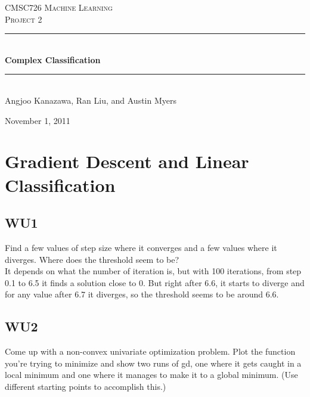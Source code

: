 \documentclass[a4paper,11pt]{article}
\newcommand{\HRule}{\rule{\linewidth}{0.5mm}}
\begin{document}
\begin{titlepage}
\begin{center}

\textsc{\LARGE CMSC726 Machine Learning}\\[1.5cm]

\textsc{\Large Project 2}\\[0.5cm]

\HRule \\[0.5cm]

{ \huge \bfseries Complex Classification}\\[0.4cm]

\HRule \\[1.5cm]

{\large Angjoo Kanazawa, Ran Liu, and Austin Myers}

\vfill

{\large November 1, 2011}

\end{center}
\end{titlepage}
{}

\section{Gradient Descent and Linear Classification}
\subsection{WU1}
\textsf{Find a few values of step size where it converges and a few
  values where it diverges. Where does the threshold seem to be?}\\

It depends on what the number of iteration is, but with 100
iterations, from step 0.1 to 6.5 it finds a solution close to
0. But right after 6.6, it starts to diverge and for any value after
6.7 it diverges, so the threshold seems to be around 6.6.

\subsection{WU2}
\textsf{Come up with a non-convex univariate optimization
  problem. Plot the function you're trying to minimize and show two
  runs of gd, one where it gets caught in a local minimum and one
  where it manages to make it to a global minimum. (Use different
  starting points to accomplish this.)}\\
\end{document}
